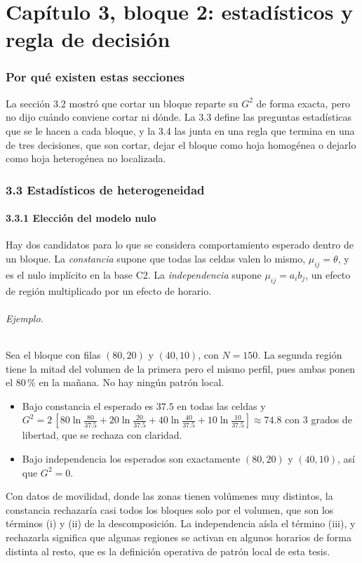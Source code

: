 \documentclass[11pt,a4paper]{article}
\begin{document}
\part{Capítulo 3, bloque 2: estadísticos y regla de decisión}

\section{Por qué existen estas secciones}

La sección 3.2 mostró que cortar un bloque reparte su $G^2$ de forma exacta, pero
no dijo cuándo conviene cortar ni dónde. La 3.3 define las preguntas estadísticas
que se le hacen a cada bloque, y la 3.4 las junta en una regla que termina en una de
tres decisiones, que son cortar, dejar el bloque como hoja homogénea o dejarlo como
hoja heterogénea no localizada.

\section{3.3 Estadísticos de heterogeneidad}

\subsection{3.3.1 Elección del modelo nulo}

Hay dos candidatos para lo que se considera comportamiento esperado dentro de un
bloque. La \emph{constancia} supone que todas las celdas valen lo mismo,
$\mu_{ij}=\theta$, y es el nulo implícito en la base C2. La \emph{independencia}
supone $\mu_{ij}=a_ib_j$, un efecto de región multiplicado por un efecto de horario.

\paragraph{Ejemplo.} Sea el bloque con filas $(80,20)$ y $(40,10)$, con $N=150$. La
segunda región tiene la mitad del volumen de la primera pero el mismo perfil, pues
ambas ponen el 80\,\% en la mañana. No hay ningún patrón local.
\begin{itemize}
\item Bajo constancia el esperado es $37.5$ en todas las celdas y
$G^2=2\,[80\ln\tfrac{80}{37.5}+20\ln\tfrac{20}{37.5}+40\ln\tfrac{40}{37.5}+10\ln\tfrac{10}{37.5}]\approx74.8$
con 3 grados de libertad, que se rechaza con claridad.
\item Bajo independencia los esperados son exactamente $(80,20)$ y $(40,10)$, así
que $G^2=0$.
\end{itemize}
Con datos de movilidad, donde las zonas tienen volúmenes muy distintos, la
constancia rechazaría casi todos los bloques solo por el volumen, que son los
términos (i) y (ii) de la descomposición. La independencia aísla el término (iii),
y rechazarla significa que algunas regiones se activan en algunos horarios de forma
distinta al resto, que es la definición operativa de patrón local de esta tesis.
\end{document}
